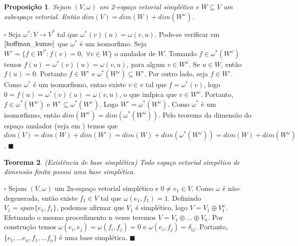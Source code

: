 \documentclass[12pt]{book}
\newtheorem{teorema}{Teorema}[section]
\newtheorem{proposicao}[teorema]{Proposição}
\newenvironment{prova}[1]{$\square$ #1}{\hfill$\blacksquare$}
\newcommand{\espacoSimpleticoOrtogonal}[1]{#1^{\omega}}
\begin{document}
	\begin{proposicao}
		Sejam $(V,\omega)$ um 2-espaço vetorial simplético e $W \subseteq V$ um subespaço vetorial. Então $dim(V) = dim(W) + dim(\espacoSimpleticoOrtogonal{W})$.
	\end{proposicao}
	\begin{prova}
		Seja $\omega^{*}: V \to V^{*}$ tal que $\omega^{*}(v)(u) = \omega(v,u)$. Pode-se verificar em $\cite{hoffman_kunze}$ que $\omega^{*}$ é um isomorfimo. Seja $W^{\circ}=\{f\in W^{*}: f(v) = 0,\; \forall v\in W \}$ o anulador de $W$. Tomando $f \in \omega^{*}(\espacoSimpleticoOrtogonal{W})$ temos $f(u) = \omega^{*}(v)(u)=\omega(v,u)$, para algum $v \in \espacoSimpleticoOrtogonal{W}$. Se $u\in W$, então $f(u) = 0$. Portanto $f \in W^{\circ}$ e  $\omega^{*}(\espacoSimpleticoOrtogonal{W})\subseteq W^{\circ}$. Por outro lado, seja $f \in W^{\circ}$. Como $\omega^{*}$ é um isomorfismo, entao existe $v \in v$ tal que $f = \omega^{*}(v)$, logo $0=f(u) = \omega^{*}(v)(u) = \omega(v,u)$, o que imlpica que $v \in \espacoSimpleticoOrtogonal{W}$. Portanto, $f \in \omega^{*}(\espacoSimpleticoOrtogonal{W})$ e $W^{\circ} \subseteq \omega^{*}(\espacoSimpleticoOrtogonal{W})$. Logo $W^{\circ} =\omega^{*}(\espacoSimpleticoOrtogonal{W})$.
		Como $\omega^{*}$ é um isomorfismo, então $dim(\espacoSimpleticoOrtogonal{W}) = dim(\omega^{*}(\espacoSimpleticoOrtogonal{W}))$. Pelo teorema da dimensão do espaço anulador (veja em \cite{hoffman_kunze}) temos que $dim(V) = dim(W)+dim(W^{\circ}) = dim(W)+dim(\omega^{*}(\espacoSimpleticoOrtogonal{W})) = dim(W)+dim(\espacoSimpleticoOrtogonal{W})$. 
	\end{prova}
	
	\begin{teorema}\label{teorema_existencia_base_simpletica}
		(Existência de base simplética) Todo espaço vetorial simpético de dimensão finita possui uma base simplética.
	\end{teorema}
	\begin{prova}
		Sejam $(V, \omega)$ um 2n-espaço vetorial simplético e $0\neq e_{1} \in V$. Como $\omega$ é não-degenerada, então existe $f_{1} \in V$ tal que $\omega(e_{1}, f_{1}) = 1$. Definindo $V_{1} = span\{e_{1}, f_{1}\}$, podemos afirmar que $V_{1}$ é simplético, logo $V = V_{1}\oplus V_{1}^{\omega}$. Efetuando o mesmo procedimento n vezes teremos $V = V_{1}\oplus \dots \oplus V_{n}$. Por construção temos $\omega(e_{i}, e_{j})=\omega(f_{i}, f_{j}) =0$ e $\omega(e_{i}, f_{j}) = \delta_{ij}$. Portanto, $\{e_{1}, \dots e_{n}, f_{1}, \dots f_{n}\}$ é uma base simplética.
	\end{prova}
	
\end{document}
